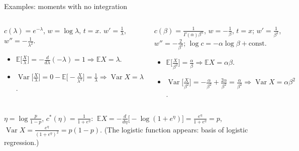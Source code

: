 \documentclass[aspectratio=169,t,10pt]{beamer}
\newcommand{\E}{\mathbb{E}}
\newcommand{\Var}{\operatorname{Var}}
\begin{document}
\begin{frame}{Examples: moments with no integration}
  \begin{columns}[T]
  \begin{tcolorbox}[myex={Poisson$(\lambda)$}]\small
  $c(\lambda)=e^{-\lambda}$, $w=\log\lambda$, $t=x$. $w'=\frac1\lambda$, $w''=-\frac1{\lambda^2}$.
  \begin{itemize}
    \item $\E\bigl[\tfrac X\lambda\bigr]=-\tfrac d{d\lambda}(-\lambda)=1\Rightarrow\E X=\lambda$.
    \item $\Var\bigl[\tfrac X\lambda\bigr]=0-\E\bigl[-\tfrac X{\lambda^2}\bigr]=\tfrac1\lambda\Rightarrow\Var X=\lambda$.
  \end{itemize}
  \end{tcolorbox}
  \begin{tcolorbox}[myex={Gamma$(\alpha,\beta)$, $\alpha$ known}]\small
  $c(\beta)=\frac1{\Gamma(\alpha)\beta^\alpha}$, $w=-\tfrac1\beta$, $t=x$; $w'=\tfrac1{\beta^2}$, $w''=-\tfrac2{\beta^3}$; $\log c=-\alpha\log\beta+\text{const}$.
  \begin{itemize}
    \item $\E\bigl[\tfrac X{\beta^2}\bigr]=\tfrac\alpha\beta\Rightarrow\E X=\alpha\beta$.
    \item $\Var\bigl[\tfrac X{\beta^2}\bigr]=-\tfrac\alpha{\beta^2}+\tfrac{2\alpha}{\beta^2}=\tfrac\alpha{\beta^2}\Rightarrow\Var X=\alpha\beta^2$.
  \end{itemize}
  \end{tcolorbox}
  \end{columns}
  \begin{tcolorbox}[myex={Bernoulli$(p)$ in natural form}]\small
  $\eta=\log\frac p{1-p}$, $c^*(\eta)=\frac1{1+e^\eta}$: $\ \E X=-\frac d{d\eta}\bigl[-\log(1+e^\eta)\bigr]=\frac{e^\eta}{1+e^\eta}=p$, \ $\Var X=\frac{e^\eta}{(1+e^\eta)^2}=p(1-p)$. (The logistic function appears: basis of logistic regression.)
  \end{tcolorbox}
\end{frame}
\end{document}
